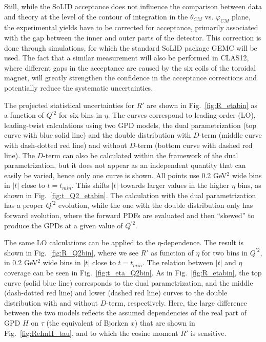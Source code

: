 Still, while the SoLID acceptance does not influence the comparison between
data and theory at the level of the contour of integration in the
$\theta_{CM}$ vs. $\varphi_{CM}$ plane, the experimental yields have to be
corrected for acceptance, primarily associated with the gap between the inner
and outer parts of the detector. This correction is done through simulations,
for which the standard SoLID package GEMC will be used. The fact that a
similar measurement will also be performed in CLAS12, where different gaps in
the acceptance are caused by the six coils of the toroidal magnet, will
greatly strengthen the confidence in the acceptance corrections and
potentially reduce the systematic uncertainties.

The projected statistical uncertainties for $R'$ are shown in
Fig.~\ref{fig:R_etabin} as a function of $Q^{\prime 2}$ for six bins in
$\eta$. The curves correspond to leading-order (LO), leading-twist
calculations using two GPD models, the dual parametrization
\cite{Polyakov:2002wz,Guzey:2006xi,Guzey:2008ys,Polyakov:2008aa} (top curve
with blue solid line) and the double distribution \cite{Radyushkin:1998es}
with $D$-term (middle curve with dash-dotted red line) and without $D$-term
(bottom curve with dashed red line). The $D$-term can also be calculated
within the framework of the dual parametrization, but it does not appear as
an independent quantity that can easily be varied, hence only one curve is
shown.
All points use 0.2 GeV$^2$ wide bins in $|t|$ close to $t=t_{min}$. This
shifts $|t|$ towards larger values in the higher $\eta$ bins, as shown in
Fig.~\ref{fig:t_Q2_etabin}.
The calculation with the dual parametrization has a proper $Q^{\prime 2}$
evolution, while the one with the double distribution only has forward
evolution, where the forward PDFs are evaluated and then ``skewed'' to
produce the GPDs at a given value of $Q^{\prime 2}$.

The same LO calculations can be applied to the $\eta$-dependence. The result
is shown in Fig.~\ref{fig:R_Q2bin}, where we see $R'$ as function of $\eta$
for two bins in $Q^{\prime 2}$, in 0.2 GeV$^2$ wide bins in $|t|$ close to 
$t=t_{min}$. The relation between $|t|$ and $\eta$ coverage can be seen in
Fig.~\ref{fig:t_eta_Q2bin}. As in Fig.~\ref{fig:R_etabin}, the top curve
(solid blue line) corresponds to the dual parametrization, and the middle
(dash-dotted red line) and lower (dashed red line) curves to the
double distribution with and without $D$-term, respectively. Here, the large
difference between the two models reflects the assumed dependencies of the
real part of GPD $H$ on $\tau$ (the equivalent of Bjorken $x$) that are shown
in Fig.~\ref{fig:ReImH_tau}, and to which the cosine moment $R'$ is sensitive.

